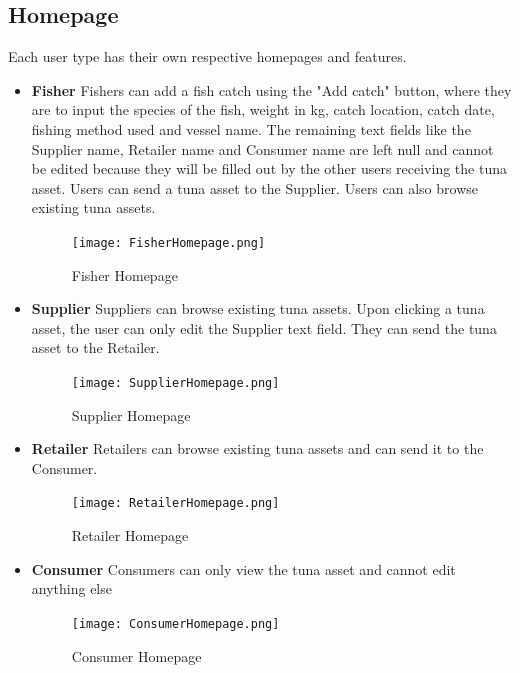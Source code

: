 \subsection{Homepage}
Each user type has their own respective homepages and features.
	\begin{itemize}
		\item \textbf{Fisher}
		Fishers can add a fish catch using the "Add catch" button, where they are to input the species of the fish, weight in kg, catch location, catch date, fishing method used and vessel name. The remaining text fields like the Supplier name, Retailer name and Consumer name are left null and cannot be edited because they will be filled out by the other users receiving the tuna asset. Users can send a tuna asset to the Supplier. Users can also browse existing tuna assets. 
		
			\begin{figure}[H]
				\centering
				\texttt{[image: FisherHomepage.png]}
				\caption{Fisher Homepage}
				\label{fig:fisherhome_page}
			\end{figure}
			
		\item \textbf{Supplier}
		Suppliers can browse existing tuna assets. Upon clicking a tuna asset, the user can only edit the Supplier text field. They can send the tuna asset to the Retailer.
		
			\begin{figure}[H]
				\centering
				\texttt{[image: SupplierHomepage.png]}
				\caption{Supplier Homepage}
				\label{fig:supplierhome_page}
			\end{figure}
			
		\item \textbf{Retailer}
		Retailers can browse existing tuna assets and can send it to the Consumer.
		
		\begin{figure}[H]
			\centering
			\texttt{[image: RetailerHomepage.png]}
			\caption{Retailer Homepage}
			\label{fig:retailerhome_page}
		\end{figure}
		
		\item \textbf{Consumer}
		Consumers can only view the tuna asset and cannot edit anything else
		
		\begin{figure}[H]
			\centering
			\texttt{[image: ConsumerHomepage.png]}
			\caption{Consumer Homepage}
			\label{fig:consumerhome_page}
		\end{figure}
		
	\end{itemize}
	
